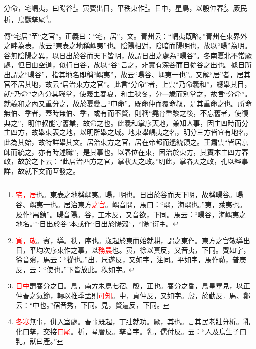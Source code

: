 分命，宅嵎夷，曰暘谷\footnote{\textcolor{red}{宅，居}也。東表之地稱嵎夷。暘，明也。日出於谷而天下明，故稱暘谷。暘谷、嵎夷一也。居治東方\textcolor{red}{之官}。嵎音隅，馬曰：“嵎，海嵎也。”夷，萊夷也。及作“禺銕”。暘音陽。谷，工木反，又音欲，下同。馬云：“暘谷，海嵎夷之地名。”“日出於谷”本或作“日出於陽穀”，“陽”衍字。}。寅賓出日，平秩東作\footnote{\textcolor{red}{寅，敬}。賓，導。秩，序也。歲起於東而始就耕，謂之東作。東方之官敬導出日，平均次序東作之事，以\textcolor{red}{務農}也。寅，徐以真反，又音夷，下同。賓如字，徐音殯，馬云：“從也。”出，尺遂反，又如字，注同。平如字，馬作蘋，普庚反，云：“使也。”下皆放此。秩如字。}。日中，星鳥，以殷仲春\footnote{\textcolor{red}{日中}謂春分之日。鳥，南方朱鳥七宿。殷，正也。春分之昏，鳥星畢見，以正仲春之氣節，轉以推季孟則\textcolor{red}{可知}。中，貞仲反，又如字。殷，於勤反，馬、鄭云：“中也。”宿音秀，下同。見，賢遍反，下同。}。厥民析，鳥獸孳尾\footnote{\textcolor{red}{冬寒}無事，併入室處。春事既起，丁壯就功。厥，其也。言其民老壯分析。乳化曰孳，交接\textcolor{red}{曰尾}。析，星曆反。孳音字。乳，儒付反。云：“人及鳥生子曰乳，獸曰產。”}。

{\noindent\zhuan{}\fzbyks 傳“宅居”至“之官”。正義曰：“宅，居”，文。青州云：“嵎夷既略。”青州在東界外之畔為表，故云“東表之地稱嵎夷”也。陰陽相對，陰暗而陽明也，故以“暘”為明。谷無陰陽之異，以日出於谷而天下皆明，故謂日出之處為“暘谷”。冬南夏北不常厥處，但日由空道，似行自谷，故以“谷”言之，非實有深谷而日從谷之出也。據日所出謂之“暘谷”，指其地名即稱“嵎夷”，故云“暘谷、嵎夷一也”。又解“居”者，居其官不居其地，故云“居治東方之官”。此言“分命”者，上雲“乃命羲和”，總舉其目，就“乃命”之內分其職掌，使羲主春夏，和主秋冬，分一歲而別掌之，故言“分命”。就羲和之內又重分之，故於夏變言“申命”。既命仲而覆命叔，是其重命之也。所命無伯、季者，蓋時無伯、季，或有而不賢，則稱“堯育重黎之後，不忘舊者，使復典之”，明仲叔能守舊業，故命之也。此羲和掌序天地，兼知人事，因主四時而分主四方，故舉東表之地，以明所舉之域。地東舉嵎夷之名，明分三方皆宜有地名，此為其始，故特詳舉其文。居治東方之官，居在帝都而遙統領之。王肅雲“皆居京師而統之，亦有時述職”，是其事也。以春位在東，因治於東方，其實本主四方春政，故於之下云：“此居治西方之官，掌秋天之政。”明此，掌春天之政，孔以經事詳，故就下文而互發之。 \par}

